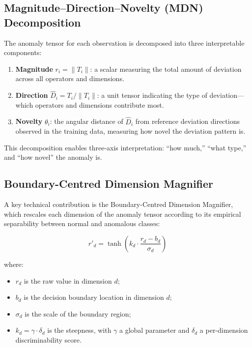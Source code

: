 \documentclass[12pt,a4paper]{article}
\begin{document}
\subsection{Magnitude--Direction--Novelty (MDN) Decomposition}

The anomaly tensor for each observation is decomposed into three 
interpretable components:

\begin{enumerate}[label=(\alph*)]
\item \textbf{Magnitude} $r_i = \|T_i\|$: a scalar measuring the total 
amount of deviation across all operators and dimensions.

\item \textbf{Direction} $\hat{D}_i = T_i / \|T_i\|$: a unit tensor 
indicating the type of deviation---which operators and dimensions contribute 
most.

\item \textbf{Novelty} $\theta_i$: the angular distance of $\hat{D}_i$ from 
reference deviation directions observed in the training data, measuring how 
novel the deviation pattern is.
\end{enumerate}

This decomposition enables three-axis interpretation: ``how much,'' ``what 
type,'' and ``how novel'' the anomaly is.

\subsection{Boundary-Centred Dimension Magnifier}

A key technical contribution is the Boundary-Centred Dimension Magnifier, 
which rescales each dimension of the anomaly tensor according to its 
empirical separability between normal and anomalous classes:

\begin{equation}
r'_d = \tanh\left(k_d \cdot \frac{r_d - b_d}{\sigma_d}\right)
\end{equation}

where:
\begin{itemize}
\item $r_d$ is the raw value in dimension $d$;
\item $b_d$ is the decision boundary location in dimension $d$;
\item $\sigma_d$ is the scale of the boundary region;
\item $k_d = \gamma \cdot \delta_d$ is the steepness, with $\gamma$ a 
global parameter and $\delta_d$ a per-dimension discriminability score.
\end{itemize}
\end{document}
